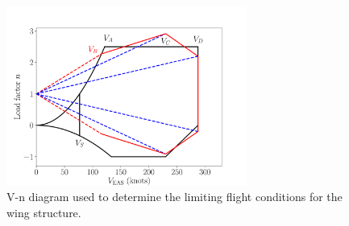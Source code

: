 \begin{figure}
\begin{center}
 \includegraphics[width=0.7\textwidth]{../Images/v_n_diagram}
 \caption{V-n diagram used to determine the limiting flight conditions for the wing structure.}
 \label{f:v_n_diagram}
\end{center}
\end{figure}
